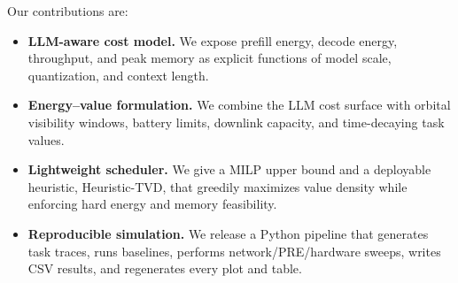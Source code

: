 Our contributions are:
\begin{itemize}
  \item \textbf{LLM-aware cost model.} We expose prefill energy, decode energy, throughput, and peak memory as explicit functions of model scale, quantization, and context length.
  \item \textbf{Energy--value formulation.} We combine the LLM cost surface with orbital visibility windows, battery limits, downlink capacity, and time-decaying task values.
  \item \textbf{Lightweight scheduler.} We give a MILP upper bound and a deployable heuristic, Heuristic-TVD, that greedily maximizes value density while enforcing hard energy and memory feasibility.
  \item \textbf{Reproducible simulation.} We release a Python pipeline that generates task traces, runs baselines, performs network/PRE/hardware sweeps, writes CSV results, and regenerates every plot and table.
\end{itemize}
